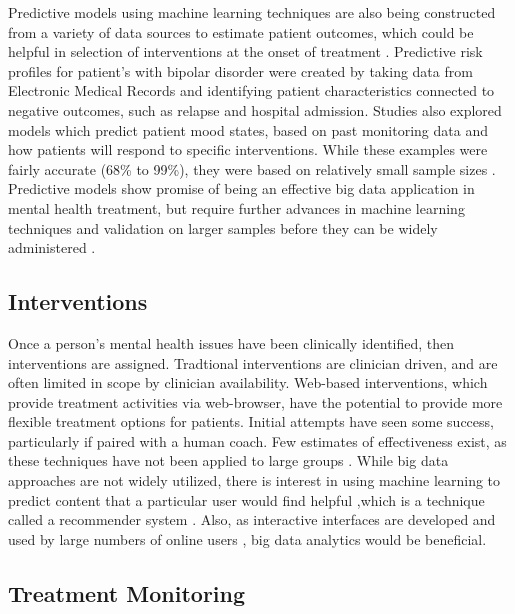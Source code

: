 \documentclass[sigconf]{acmart}
\begin{document}
Predictive models using machine learning techniques are also being constructed from a variety of data sources to estimate patient outcomes, which could be helpful in selection of interventions at the onset of treatment \cite{bigdatabipolar}. Predictive risk profiles for patient's with bipolar disorder were created by taking data from Electronic Medical Records and identifying patient characteristics connected to negative outcomes, such as relapse and hospital admission. Studies also explored models which predict patient mood states, based on past monitoring data and how patients will respond to specific interventions. While these examples were fairly accurate (68\% to 99\%), they were based on relatively small sample sizes \cite{machinelearnbipolar}.  Predictive models show promise of being an effective big data application in mental health treatment, but require further advances in machine learning techniques and validation on larger samples before they can be widely administered \cite{bigdatabipolar}.

\subsection{Interventions}

Once a person's mental health issues have been clinically identified, then interventions are assigned. Tradtional interventions are clinician driven, and are often limited in scope by clinician availability. Web-based interventions, which provide treatment activities via web-browser, have the potential to provide more flexible treatment options for patients. Initial attempts have seen some success, particularly if paired with a human coach. Few estimates of effectiveness exist, as these techniques have not been applied to large groups \cite{webtx}. While big data approaches are not widely utilized, there is interest in using machine learning to predict content that a particular user would find helpful \cite{bitreview},which is a technique called a recommender system \cite{recomdef}. Also, as interactive interfaces are developed and used by large numbers of online users \cite{webtx}, big data analytics would be beneficial. 

\subsection{Treatment Monitoring}
\end{document}
